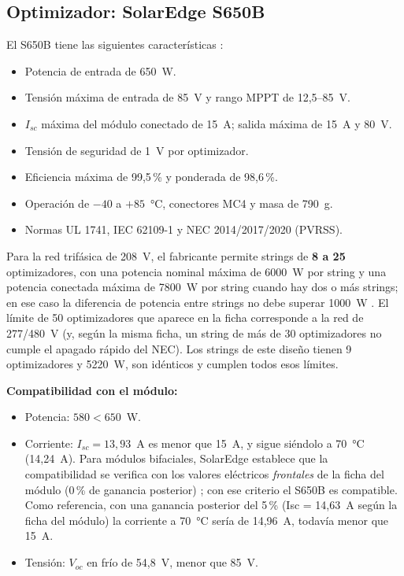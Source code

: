 \documentclass[12pt]{article}
\begin{document}
\subsection{Optimizador: SolarEdge S650B}
El S650B tiene las siguientes características \cite{seOpt}:
\begin{itemize}
\item Potencia de entrada de \SI{650}{\watt}.
\item Tensión máxima de entrada de \SI{85}{\volt} y rango MPPT de 12,5--85~V.
\item $I_{sc}$ máxima del módulo conectado de \SI{15}{\ampere}; salida máxima de \SI{15}{\ampere} y \SI{80}{\volt}.
\item Tensión de seguridad de \SI{1}{\volt} por optimizador.
\item Eficiencia máxima de 99,5\,\% y ponderada de 98,6\,\%.
\item Operación de $-40$ a $+85$~°C, conectores MC4 y masa de 790~g.
\item Normas UL 1741, IEC 62109-1 y NEC 2014/2017/2020 (PVRSS).
\end{itemize}

Para la red trifásica de 208~V, el fabricante permite strings de \textbf{8 a 25} optimizadores, con una potencia nominal máxima de \SI{6000}{\watt} por string y una potencia conectada máxima de \SI{7800}{\watt} por string cuando hay dos o más strings; en ese caso la diferencia de potencia entre strings no debe superar \SI{1000}{\watt} \cite{seOpt}. El límite de 50 optimizadores que aparece en la ficha corresponde a la red de 277/480~V (y, según la misma ficha, un string de más de 30 optimizadores no cumple el apagado rápido del NEC). Los strings de este diseño tienen 9 optimizadores y \SI{5220}{\watt}, son idénticos y cumplen todos esos límites.

\textbf{Compatibilidad con el módulo:}
\begin{itemize}
\item Potencia: $580 < 650$~W.
\item Corriente: $I_{sc}=13{,}93$~A es menor que 15~A, y sigue siéndolo a \SI{70}{\celsius} (14,24~A). Para módulos bifaciales, SolarEdge establece que la compatibilidad se verifica con los valores eléctricos \emph{frontales} de la ficha del módulo (0\,\% de ganancia posterior) \cite{seBifacial}; con ese criterio el S650B es compatible. Como referencia, con una ganancia posterior del 5\,\% (Isc = 14,63~A según la ficha del módulo) la corriente a 70~°C sería de 14,96~A, todavía menor que 15~A.
\item Tensión: $V_{oc}$ en frío de 54,8~V, menor que 85~V.
\end{itemize}
\end{document}

